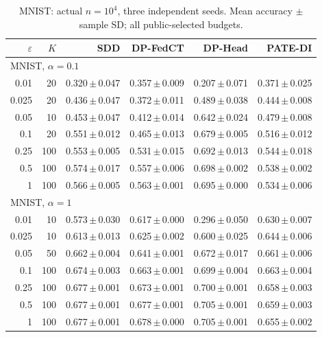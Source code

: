 \begin{table}[t]
\centering
\caption{MNIST: actual $n=10^4$, three independent seeds. Mean accuracy $\pm$ sample SD; all public-selected budgets.}
\label{tab:new-mnist}
\small\setlength{\tabcolsep}{3pt}
\begin{tabular}{@{}rrrrrr@{}}\toprule
$\varepsilon$ & $K$ & SDD & DP-FedCT & DP-Head & PATE-DI \\\midrule
\multicolumn{6}{l}{MNIST, $\alpha=0.1$} \\
0.01 & 20 & 0.320\,$\pm$\,0.047 & 0.357\,$\pm$\,0.009 & 0.207\,$\pm$\,0.071 & 0.371\,$\pm$\,0.025 \\
0.025 & 20 & 0.436\,$\pm$\,0.047 & 0.372\,$\pm$\,0.011 & 0.489\,$\pm$\,0.038 & 0.444\,$\pm$\,0.008 \\
0.05 & 10 & 0.453\,$\pm$\,0.047 & 0.412\,$\pm$\,0.014 & 0.642\,$\pm$\,0.024 & 0.479\,$\pm$\,0.008 \\
0.1 & 20 & 0.551\,$\pm$\,0.012 & 0.465\,$\pm$\,0.013 & 0.679\,$\pm$\,0.005 & 0.516\,$\pm$\,0.012 \\
0.25 & 100 & 0.553\,$\pm$\,0.005 & 0.531\,$\pm$\,0.015 & 0.692\,$\pm$\,0.013 & 0.544\,$\pm$\,0.018 \\
0.5 & 100 & 0.574\,$\pm$\,0.017 & 0.557\,$\pm$\,0.006 & 0.698\,$\pm$\,0.002 & 0.538\,$\pm$\,0.002 \\
1 & 100 & 0.566\,$\pm$\,0.005 & 0.563\,$\pm$\,0.001 & 0.695\,$\pm$\,0.000 & 0.534\,$\pm$\,0.006 \\
\multicolumn{6}{l}{MNIST, $\alpha=1$} \\
0.01 & 10 & 0.573\,$\pm$\,0.030 & 0.617\,$\pm$\,0.000 & 0.296\,$\pm$\,0.050 & 0.630\,$\pm$\,0.007 \\
0.025 & 10 & 0.613\,$\pm$\,0.013 & 0.625\,$\pm$\,0.002 & 0.600\,$\pm$\,0.025 & 0.644\,$\pm$\,0.006 \\
0.05 & 50 & 0.662\,$\pm$\,0.004 & 0.641\,$\pm$\,0.001 & 0.672\,$\pm$\,0.017 & 0.661\,$\pm$\,0.006 \\
0.1 & 100 & 0.674\,$\pm$\,0.003 & 0.663\,$\pm$\,0.001 & 0.699\,$\pm$\,0.004 & 0.663\,$\pm$\,0.004 \\
0.25 & 100 & 0.677\,$\pm$\,0.001 & 0.673\,$\pm$\,0.001 & 0.700\,$\pm$\,0.001 & 0.658\,$\pm$\,0.003 \\
0.5 & 100 & 0.677\,$\pm$\,0.001 & 0.677\,$\pm$\,0.001 & 0.705\,$\pm$\,0.001 & 0.659\,$\pm$\,0.003 \\
1 & 100 & 0.677\,$\pm$\,0.001 & 0.678\,$\pm$\,0.000 & 0.705\,$\pm$\,0.001 & 0.655\,$\pm$\,0.002 \\
\bottomrule\end{tabular}
\end{table}


